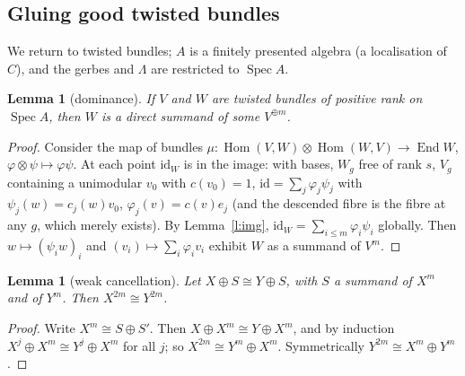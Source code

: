 \documentclass[11pt]{amsart}
\newtheorem{lemma}[theorem]{Lemma}
\theoremstyle{definition}
\theoremstyle{remark}
\newcommand{\Spec}{\operatorname{Spec}}
\newcommand{\Hom}{\operatorname{Hom}}
\newcommand{\End}{\operatorname{End}}
\begin{document}
\subsection{Gluing good twisted bundles}\label{s:glue}
We return to twisted bundles; $A$ is a finitely presented algebra
(a localisation of $C$), and the gerbes and $\Lambda$ are restricted to
$\Spec A$.

\begin{lemma}[dominance]\label{l:dom}
If $V$ and $W$ are twisted bundles of positive rank on $\Spec A$, then $W$
is a direct summand of some $V^{\oplus m}$.
\end{lemma}
\begin{proof}
Consider the map of bundles $\mu:\Hom(V,W)\otimes\Hom(W,V)\to\End W$,
$\varphi\otimes\psi\mapsto\varphi\psi$. At each point $\mathrm{id}_W$ is
in the image: with bases, $W_g$ free of rank $s$, $V_g$ containing a
unimodular $v_0$ with $c(v_0)=1$, $\mathrm{id}=\sum_j\varphi_j\psi_j$ with
$\psi_j(w)=c_j(w)v_0$, $\varphi_j(v)=c(v)e_j$ (and the descended fibre is
the fibre at any $g$, which merely exists). By Lemma~\ref{l:img},
$\mathrm{id}_W=\sum_{i\le m}\varphi_i\psi_i$ globally. Then $w\mapsto(\psi_iw)_i$
and $(v_i)\mapsto\sum_i\varphi_iv_i$ exhibit $W$ as a summand of $V^m$.
\end{proof}

\begin{lemma}[weak cancellation]\label{l:cancel}
Let $X\oplus S\cong Y\oplus S$, with $S$ a summand of $X^{m}$ and of
$Y^{m}$. Then $X^{2m}\cong Y^{2m}$.
\end{lemma}
\begin{proof}
Write $X^m\cong S\oplus S'$. Then $X\oplus X^m\cong Y\oplus X^m$, and by
induction $X^j\oplus X^m\cong Y^j\oplus X^m$ for all $j$; so $X^{2m}\cong
Y^m\oplus X^m$. Symmetrically $Y^{2m}\cong X^m\oplus Y^m$.
\end{proof}
\end{document}
